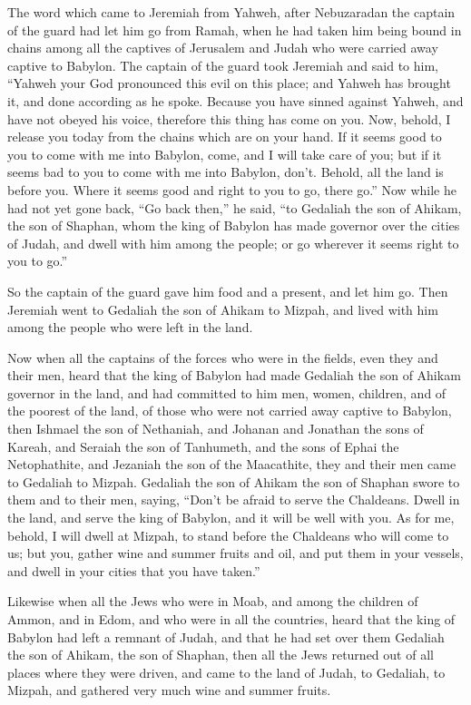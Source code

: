  The word which came to Jeremiah from Yahweh, after
Nebuzaradan the captain of the guard had let him go from Ramah, when he
had taken him being bound in chains among all the captives of Jerusalem
and Judah who were carried away captive to Babylon.  The
captain of the guard took Jeremiah and said to him, ``Yahweh your God
pronounced this evil on this place;  and Yahweh has brought
it, and done according as he spoke. Because you have sinned against
Yahweh, and have not obeyed his voice, therefore this thing has come on
you.  Now, behold, I release you today from the chains which
are on your hand. If it seems good to you to come with me into Babylon,
come, and I will take care of you; but if it seems bad to you to come
with me into Babylon, don't. Behold, all the land is before you. Where
it seems good and right to you to go, there go.''  Now while
he had not yet gone back, ``Go back then,'' he said, ``to Gedaliah the
son of Ahikam, the son of Shaphan, whom the king of Babylon has made
governor over the cities of Judah, and dwell with him among the people;
or go wherever it seems right to you to go.''

So the captain of the guard gave him food and a present, and let him go.
 Then Jeremiah went to Gedaliah the son of Ahikam to Mizpah,
and lived with him among the people who were left in the land.

 Now when all the captains of the forces who were in the
fields, even they and their men, heard that the king of Babylon had made
Gedaliah the son of Ahikam governor in the land, and had committed to
him men, women, children, and of the poorest of the land, of those who
were not carried away captive to Babylon,  then Ishmael the
son of Nethaniah, and Johanan and Jonathan the sons of Kareah, and
Seraiah the son of Tanhumeth, and the sons of Ephai the Netophathite,
and Jezaniah the son of the Maacathite, they and their men came to
Gedaliah to Mizpah.  Gedaliah the son of Ahikam the son of
Shaphan swore to them and to their men, saying, ``Don't be afraid to
serve the Chaldeans. Dwell in the land, and serve the king of Babylon,
and it will be well with you.  As for me, behold, I will
dwell at Mizpah, to stand before the Chaldeans who will come to us; but
you, gather wine and summer fruits and oil, and put them in your
vessels, and dwell in your cities that you have taken.''

 Likewise when all the Jews who were in Moab, and among the
children of Ammon, and in Edom, and who were in all the countries, heard
that the king of Babylon had left a remnant of Judah, and that he had
set over them Gedaliah the son of Ahikam, the son of Shaphan,
 then all the Jews returned out of all places where they
were driven, and came to the land of Judah, to Gedaliah, to Mizpah, and
gathered very much wine and summer fruits.

